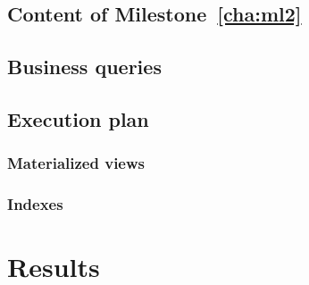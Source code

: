     \section{Content of Milestone~\ref{cha:ml2}} 
        \label{sec:ml2_content}
    

    \section{Business queries} \label{sec:ml2_queries}
    
    
    \section{Execution plan} %
    \label{sec:exec_plan}
    
    \subsection{Materialized views} \label{sub:ml2_views}
    
    \clearpage
    \subsection{Indexes} \label{sub:ml2_indexes}
    
    
    \chapter{Results} %
    \label{cha:Results}
    
    


%    




